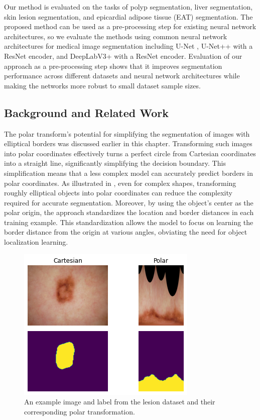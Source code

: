 Our method is evaluated on 
the tasks of polyp segmentation, liver segmentation, skin 
lesion segmentation, and epicardial adipose tissue (EAT) segmentation.
The proposed method can be used as a pre-processing step for 
existing neural network architectures, so we evaluate the methods using
common neural network architectures for medical image segmentation including U-Net 
\cite{ronnebergerUNetConvolutionalNetworks2015}, U-Net++ 
\cite{zhou2019unetplusplus} with a ResNet \cite{heDeepResidualLearning2016} encoder, and DeepLabV3+ \cite{chenEncoderDecoderAtrousSeparable2018} with a ResNet \cite{heDeepResidualLearning2016} encoder. Evaluation of our approach as a pre-processing step shows that it improves segmentation performance across different datasets and neural network architectures while making the networks more robust to small dataset sample sizes.

\subsection{Background and Related Work}

The polar transform's potential for simplifying the segmentation of images with elliptical borders was discussed earlier in this chapter. Transforming such images into polar coordinates effectively turns a perfect circle from Cartesian coordinates into a straight line, significantly simplifying the decision boundary. This simplification means that a less complex model can accurately predict borders in polar coordinates. As illustrated in , even for complex shapes, transforming roughly elliptical objects into polar coordinates can reduce the complexity required for accurate segmentation. Moreover, by using the object's center as the polar origin, the approach standardizes the location and border distances in each training example. This standardization allows the model to focus on learning the border distance from the origin at various angles, obviating the need for object localization learning.

\clearpage

	\begin{figure}[h]
		\centering
		\includegraphics[width=0.4\linewidth]{images/4/to_polar}
		\caption{An example image and label from the lesion dataset and their corresponding polar transformation. \cite{bencevicTrainingPolarImage2021}}
		\label{fig:polar-lesion}
	\end{figure}


